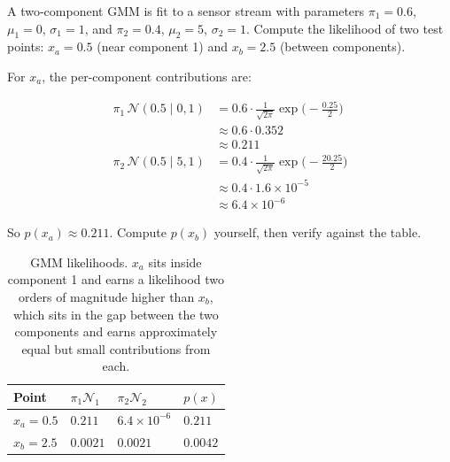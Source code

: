 \vspace{2.5em}

A two-component GMM is fit to a sensor stream with parameters $\pi_1{=}0.6$, $\mu_1{=}0$, $\sigma_1{=}1$, and $\pi_2{=}0.4$, $\mu_2{=}5$, $\sigma_2{=}1$.
Compute the likelihood of two test points: $x_a = 0.5$ (near component 1) and $x_b = 2.5$ (between components).

For $x_a$, the per-component contributions are:

\begin{align*}
    \pi_1 \, \mathcal{N}(0.5 \mid 0, 1) &= 0.6 \cdot \tfrac{1}{\sqrt{2\pi}} \exp\!\bigl(-\tfrac{0.25}{2}\bigr) \\
                                          &\approx 0.6 \cdot 0.352 \\
                                          &\approx 0.211 \\[4pt]
    \pi_2 \, \mathcal{N}(0.5 \mid 5, 1) &= 0.4 \cdot \tfrac{1}{\sqrt{2\pi}} \exp\!\bigl(-\tfrac{20.25}{2}\bigr) \\
                                          &\approx 0.4 \cdot 1.6\times10^{-5} \\
                                          &\approx 6.4\times10^{-6}
\end{align*}

So $p(x_a) \approx 0.211$.
Compute $p(x_b)$ yourself, then verify against the table.

\begin{table}[ht]
\centering
\begin{tabular}{p{}p{}p{}p{}}
    \toprule
    \textbf{Point} & \textbf{$\pi_1\mathcal{N}_1$} & \textbf{$\pi_2\mathcal{N}_2$} & \textbf{$p(x)$} \\
    \midrule
    $x_a = 0.5$ & $0.211$  & $6.4\times10^{-6}$ & $0.211$ \\
    $x_b = 2.5$ & $0.0021$ & $0.0021$           & $0.0042$ \\
    \bottomrule
\end{tabular}
\vspace{2em}
\caption{GMM likelihoods. $x_a$ sits inside component 1 and earns a likelihood two orders of magnitude higher than $x_b$, which sits in the gap between the two components and earns approximately equal but small contributions from each.}
\label{tab:gmm_likelihood}
\end{table}


